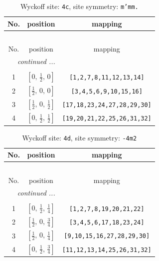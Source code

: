 \documentclass[fleqn,8pt]{jsarticle}
\begin{document}
\renewcommand{\arraystretch}{1.2}
\begin{longtable}{ccc}
\caption{Wyckoff site: {\tt 4c}, site symmetry: {\tt m'mm.}}
 \\
 \hline \hline
No. & position & mapping \\ \hline \endfirsthead

\multicolumn{2}{l}{\tablename\ \thetable{}} \\
 \hline \hline
No. & position & mapping \\ \hline \endhead

 \hline \hline
\multicolumn{2}{r}{\footnotesize\it continued ...} \\ \endfoot

 \hline \hline
\multicolumn{2}{r}{} \\ \endlastfoot

1 & $\left[ 0,\, \frac{1}{2},\, 0 \right]$ & {\tt [1,2,7,8,11,12,13,14]} \\ \hline
2 & $\left[ \frac{1}{2},\, 0,\, 0 \right]$ & {\tt [3,4,5,6,9,10,15,16]} \\ \hline
3 & $\left[ \frac{1}{2},\, 0,\, \frac{1}{2} \right]$ & {\tt [17,18,23,24,27,28,29,30]} \\ \hline
4 & $\left[ 0,\, \frac{1}{2},\, \frac{1}{2} \right]$ & {\tt [19,20,21,22,25,26,31,32]} \\
\end{longtable}
\renewcommand{\arraystretch}{1.2}
\begin{longtable}{ccc}
\caption{Wyckoff site: {\tt 4d}, site symmetry: {\tt -4m2}}
 \\
 \hline \hline
No. & position & mapping \\ \hline \endfirsthead

\multicolumn{2}{l}{\tablename\ \thetable{}} \\
 \hline \hline
No. & position & mapping \\ \hline \endhead

 \hline \hline
\multicolumn{2}{r}{\footnotesize\it continued ...} \\ \endfoot

 \hline \hline
\multicolumn{2}{r}{} \\ \endlastfoot

1 & $\left[ 0,\, \frac{1}{2},\, \frac{1}{4} \right]$ & {\tt [1,2,7,8,19,20,21,22]} \\ \hline
2 & $\left[ \frac{1}{2},\, 0,\, \frac{3}{4} \right]$ & {\tt [3,4,5,6,17,18,23,24]} \\ \hline
3 & $\left[ \frac{1}{2},\, 0,\, \frac{1}{4} \right]$ & {\tt [9,10,15,16,27,28,29,30]} \\ \hline
4 & $\left[ 0,\, \frac{1}{2},\, \frac{3}{4} \right]$ & {\tt [11,12,13,14,25,26,31,32]} \\
\end{longtable}
\end{document}

